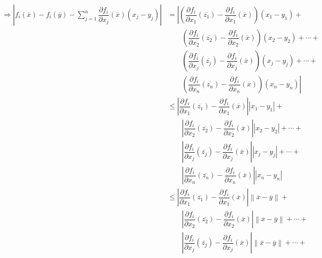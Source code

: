 \documentclass[fleqn]{article}
\begin{document}
	\begin{equation*}
		\begin{split}
			\Longrightarrow \left\lvert f_i(\overline{x}) - f_i(\overline{y}) - \sum_{j=1}^{n} \dfrac{\partial f_i}{\partial x_j} (\overline{x}) \left( x_j - y_j \right) \right\rvert &= \left\lvert \left( \dfrac{\partial f_i}{\partial x_1} (\overline{z_1}) - \dfrac{\partial f_i}{\partial x_1} (\overline{x}) \right) \left( x_1 - y_1 \right) + \right. \\
			& \qquad \left( \dfrac{\partial f_i}{\partial x_2} (\overline{z_2}) - \dfrac{\partial f_i}{\partial x_2} (\overline{x}) \right) \left( x_2 - y_2 \right) + \cdots + \\
			& \qquad \left( \dfrac{\partial f_i}{\partial x_j} (\overline{z_j}) - \dfrac{\partial f_i}{\partial x_j} (\overline{x}) \right) \left( x_j - y_j \right) + \cdots + \\
			& \qquad \left. \left( \dfrac{\partial f_i}{\partial x_n} (\overline{z_n}) - \dfrac{\partial f_i}{\partial x_n} (\overline{x}) \right) \left( x_n - y_n \right) \right\rvert \\
			&\leq \left\lvert \dfrac{\partial f_i}{\partial x_1} (\overline{z_1}) - \dfrac{\partial f_i}{\partial x_1} (\overline{x}) \right\rvert \left\lvert x_1 - y_1 \right\rvert + \\
			& \qquad \left\lvert \dfrac{\partial f_i}{\partial x_2} (\overline{z_2}) - \dfrac{\partial f_i}{\partial x_2} (\overline{x}) \right\rvert \left\lvert x_2 - y_2 \right\rvert + \cdots + \\
			& \qquad \left\lvert \dfrac{\partial f_i}{\partial x_j} (\overline{z_j}) - \dfrac{\partial f_i}{\partial x_j} (\overline{x}) \right\rvert \left\lvert x_j - y_j \right\rvert + \cdots + \\
			& \qquad \left\lvert \dfrac{\partial f_i}{\partial x_n} (\overline{z_n}) - \dfrac{\partial f_i}{\partial x_n} (\overline{x}) \right\rvert \left\lvert x_n - y_n \right\rvert \\
			&\leq \left\lvert \dfrac{\partial f_i}{\partial x_1} (\overline{z_1}) - \dfrac{\partial f_i}{\partial x_1} (\overline{x}) \right\rvert \left\lVert \overline{x} - \overline{y} \right\rVert + \\
			& \qquad \left\lvert \dfrac{\partial f_i}{\partial x_2} (\overline{z_2}) - \dfrac{\partial f_i}{\partial x_2} (\overline{x}) \right\rvert \left\lVert \overline{x} - \overline{y} \right\rVert + \cdots + \\
			& \qquad \left\lvert \dfrac{\partial f_i}{\partial x_j} (\overline{z_j}) - \dfrac{\partial f_i}{\partial x_j} (\overline{x}) \right\rvert \left\lVert \overline{x} - \overline{y} \right\rVert + \cdots + \\

\end{split}
\end{equation*}
\end{document}

